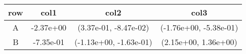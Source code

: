 \begin{tabular}{cccc}
\toprule
row&col1&col2&col3\tabularnewline
\midrule
A&-2.37e+00& (3.37e-01, -8.47e-02)& (-1.76e+00, -5.38e-01)\tabularnewline
B&-7.35e-01& (-1.13e+00, -1.63e-01)& (2.15e+00, 1.36e+00)\tabularnewline
\bottomrule
\end{tabular}
